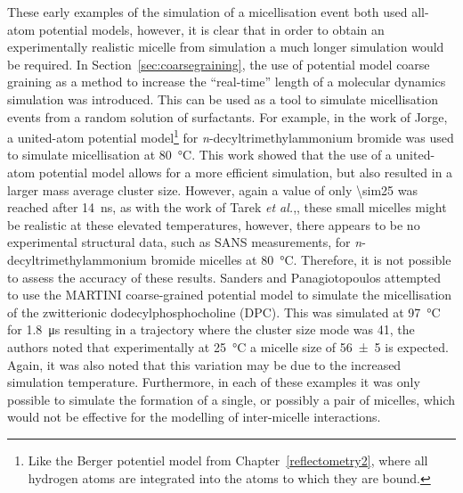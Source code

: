 These early examples of the simulation of a micellisation event both used all-atom potential models,\autocite{tarek_molecular_1998,maillet_large_1999} however, it is clear that in order to obtain an experimentally realistic micelle from simulation a much longer simulation would be required.
In Section~\ref{sec:coarsegraining}, the use of potential model coarse graining as a method to increase the ``real-time'' length of a molecular dynamics simulation was introduced.
This can be used as a tool to simulate micellisation events from a random solution of surfactants.
For example, in the work of Jorge,\autocite{jorge_molecular_2008} a united-atom potential model\footnote{Like the Berger potentiel model from Chapter~\ref{reflectometry2}, where all hydrogen atoms are integrated into the atoms to which they are bound.} for \emph{n}-decyltrimethylammonium bromide was used to simulate micellisation at \SI{80}{\celsius}.
This work showed that the use of a united-atom potential model allows for a more efficient simulation, but also resulted in a larger mass average cluster size.
However, again a value of only \num{\sim25} was reached after \SI{14}{\nano\second}, as with the work of Tarek \emph{et al.},\autocite{tarek_molecular_1998}, these small micelles might be realistic at these elevated temperatures, however, there appears to be no experimental structural data, such as SANS measurements, for \emph{n}-decyltrimethylammonium bromide micelles at \SI{80}{\celsius}.
Therefore, it is not possible to assess the accuracy of these results.
Sanders and Panagiotopoulos attempted to use the MARTINI coarse-grained potential model to simulate the micellisation of the zwitterionic dodecylphosphocholine (DPC).\autocite{sanders_micellization_2010}
This was simulated at \SI{97}{\celsius} for \SI{1.8}{\micro\second} resulting in a trajectory where the cluster size mode was 41, the authors noted that experimentally at \SI{25}{\celsius} a micelle size of \num{56\pm5} is expected.
Again, it was also noted that this variation may be due to the increased simulation temperature.\autocite{malliaris_temperature_1985,kamenka_aqueous_1995}
Furthermore, in each of these examples it was only possible to simulate the formation of a single, or possibly a pair of micelles, which would not be effective for the modelling of inter-micelle interactions.

